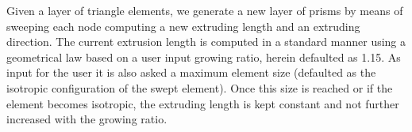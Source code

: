 \documentclass[1p]{elsarticle}
\begin{document}


Given a layer of triangle elements, we generate a new layer of prisms by means of sweeping each node computing a new extruding length and an extruding direction. 
The current extrusion length is computed in a standard manner using a geometrical law based on a user input growing ratio, herein defaulted as 1.15.
As input for the user it is also asked a maximum element size (defaulted as the isotropic configuration of the swept element). Once this size is reached or if the element becomes isotropic, the extruding length is kept constant and not further increased with the growing ratio.
\end{document}
